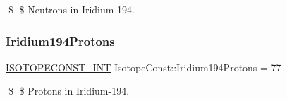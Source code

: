 \$ \$ Neutrons in Iridium-\/194. \mbox{\label{group___isotope_const-_iridium-_ir194_gab30f4a338ec4e7afa442868baee30a0a}} 
\subsubsection{\texorpdfstring{Iridium194\+Protons}{Iridium194Protons}}
{\footnotesize\ttfamily \mbox{\hyperlink{group___isotope_const-_macros_ga5f18360b3e99483a35c32d789e62621c}{I\+S\+O\+T\+O\+P\+E\+C\+O\+N\+S\+T\+\_\+\+I\+NT}} Isotope\+Const\+::\+Iridium194\+Protons = 77}

\$ \$ Protons in Iridium-\/194. 